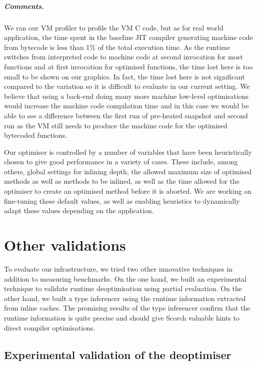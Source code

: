 \documentclass[a4paper,12pt,twoside]{../includes/ThesisStyle}
\begin{document}
\subparagraph{Comments.}

We ran our VM profiler to profile the VM C code, but as for real world application, the time spent in the baseline JIT compiler generating machine code from bytecode is less than 1\% of the total execution time. As the runtime switches from interpreted code to machine code at second invocation for most functions and at first invocation for optimised functions, the time lost here is too small to be shown on our graphics. In fact, the time lost here is not significant compared to the variation so it is difficult to evaluate in our current setting. We believe that using a back-end doing many more machine low-level optimisations would increase the machine code compilation time and in this case we would be able to see a difference between the first run of pre-heated snapshot and second run as the VM still needs to produce the machine code for the optimised bytecoded functions.

Our optimiser is controlled by a number of variables that have been heuristically chosen to give good performance in a variety of cases. These include, among others, global settings for inlining depth, the allowed maximum size of optimised methods as well as methods to be inlined, as well as the time allowed for the optimiser to create an optimised method before it is aborted. We are working on fine-tuning these default values, as well as enabling heuristics to dynamically adapt these values depending on the application.

\section{Other validations}
\label{sec:otherValid}

To evaluate our infrastructure, we tried two other innovative techniques in addition to measuring benchmarks. On the one hand, we built an experimental technique to validate runtime deoptimisation using partial evaluation. On the other hand, we built a type inferencer using the runtime information extracted from inline caches. The promising results of the type inferencer confirm that the runtime information is quite precise and should give Scorch valuable hints to direct compiler optimisations.

\subsection{Experimental validation of the deoptimiser}
\end{document}
